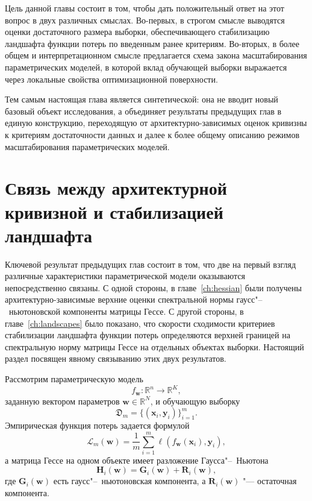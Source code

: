 Цель данной главы состоит в том, чтобы дать положительный ответ на этот вопрос в двух различных смыслах. Во-первых, в строгом смысле выводятся оценки достаточного размера выборки, обеспечивающего стабилизацию ландшафта функции потерь по введенным ранее критериям. Во-вторых, в более общем и интерпретационном смысле предлагается схема закона масштабирования параметрических моделей, в которой вклад обучающей выборки выражается через локальные свойства оптимизационной поверхности.

Тем самым настоящая глава является синтетической: она не вводит новый базовый объект исследования, а объединяет результаты предыдущих глав в единую конструкцию, переходящую от архитектурно-зависимых оценок кривизны к критериям достаточности данных и далее к более общему описанию режимов масштабирования параметрических моделей.

\section{Связь между архитектурной кривизной и стабилизацией ландшафта}

Ключевой результат предыдущих глав состоит в том, что две на первый взгляд различные характеристики параметрической модели оказываются непосредственно связаны. С одной стороны, в главе~\ref{ch:hessian} были получены архитектурно-зависимые верхние оценки спектральной нормы гаусс"--~ньютоновской компоненты матрицы Гессе. С другой стороны, в главе~\ref{ch:landscapes} было показано, что скорости сходимости критериев стабилизации ландшафта функции потерь определяются верхней границей на спектральную норму матрицы Гессе на отдельных объектах выборки. Настоящий раздел посвящен явному связыванию этих двух результатов.

Рассмотрим параметрическую модель
\begin{equation}
    f_{\mathbf w} : \mathbb R^n \to \mathbb R^K,
\end{equation}
заданную вектором параметров $\mathbf w \in \mathbb R^N$, и обучающую выборку
\begin{equation}
    \mathfrak D_m = \{(\mathbf x_i,\mathbf y_i)\}_{i=1}^m.
\end{equation}
Эмпирическая функция потерь задается формулой
\begin{equation}
    \mathcal L_m(\mathbf w)
    =
    \frac{1}{m}\sum_{i=1}^m \ell(f_{\mathbf w}(\mathbf x_i),\mathbf y_i),
\end{equation}
а матрица Гессе на одном объекте имеет разложение Гаусса"--~Ньютона
\begin{equation}
    \mathbf H_i(\mathbf w)
    =
    \mathbf G_i(\mathbf w) + \mathbf R_i(\mathbf w),
\end{equation}
где $\mathbf G_i(\mathbf w)$ есть гаусс"--~ньютоновская компонента, а $\mathbf R_i(\mathbf w)$ "--- остаточная компонента.

